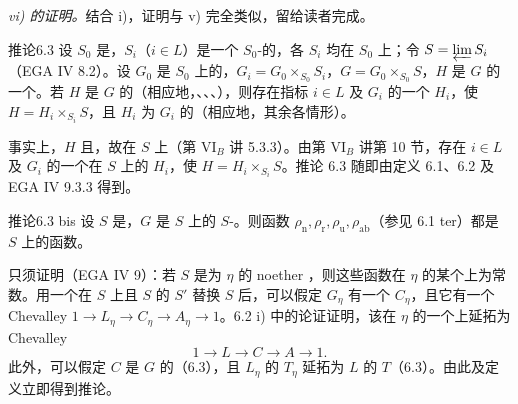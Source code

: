 \emph{vi) 的证明。}结合 i)，证明与 v) 完全类似，留给读者完成。
\begin{SGAresult}{推论}{6.3}
设 $S_0$ 是，$S_i$（$i\in L$）是一个 $S_0$-的，各 $S_i$ 均在 $S_0$ 上；令 $S=\varprojlim S_i$（EGA IV 8.2）。设 $G_0$ 是 $S_0$ 上的，$G_i=G_0\times_{S_0}S_i$，$G=G_0\times_{S_0}S$，$H$ 是 $G$ 的一个。若 $H$ 是 $G$ 的（相应地，、、、），则存在指标 $i\in L$ 及 $G_i$ 的一个 $H_i$，使 $H=H_i\times_{S_i}S$，且 $H_i$ 为 $G_i$ 的（相应地，其余各情形）。
\end{SGAresult}
事实上，$H$ 且，故在 $S$ 上（第 VI$_B$ 讲 5.3.3）。由第 VI$_B$ 讲第 10 节，存在 $i\in L$ 及 $G_i$ 的一个在 $S$ 上的 $H_i$，使 $H=H_i\times_{S_i}S$。推论 6.3 随即由定义 6.1、6.2 及 EGA IV 9.3.3 得到。
\begin{SGAresult}{推论}{6.3 bis}
设 $S$ 是，$G$ 是 $S$ 上的 $S$-。则函数 $\rho_{\mathrm n},\rho_{\mathrm r},\rho_{\mathrm u},\rho_{\mathrm{ab}}$（参见 6.1 ter）都是 $S$ 上的函数。
\end{SGAresult}
只须证明（EGA IV 9）：若 $S$ 是为 $\eta$ 的 noether ，则这些函数在 $\eta$ 的某个上为常数。用一个在 $S$ 上且 $S$ 的 $S'$ 替换 $S$ 后，可以假定 $G_\eta$ 有一个 $C_\eta$，且它有一个 Chevalley  $1\to L_\eta\to C_\eta\to A_\eta\to1$。6.2 i) 中的论证证明，该在 $\eta$ 的一个上延拓为 Chevalley 
\[1\longrightarrow L\longrightarrow C\longrightarrow A\longrightarrow1.\]
此外，可以假定 $C$ 是 $G$ 的（6.3），且 $L_\eta$ 的 $T_\eta$ 延拓为 $L$ 的 $T$（6.3）。由此及定义立即得到推论。

